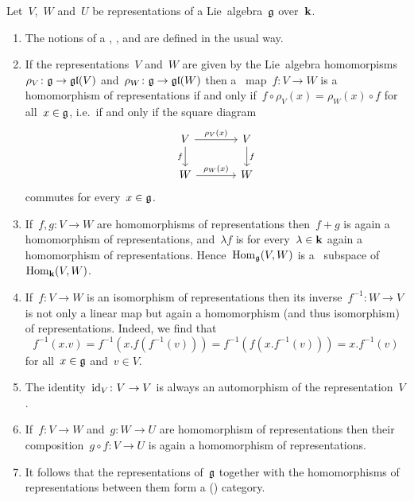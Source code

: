 \begin{remark}
  Let~$V$,~$W$ and~$U$ be representations of a Lie~algebra~$\mathfrak{g}$ over~$\kf$.
  \begin{enumerate}
    \item
      The notions of a , ,  and  are defined in the usual way.
    \item
      If the representations~$V$ and~$W$ are given by the Lie~algebra homomorpisms~$\rho_V \colon \mathfrak{g} \to \mathfrak{gl}(V)$ and~$\rho_W \colon \mathfrak{g} \to \mathfrak{gl}(W)$ then a~{\linear{$\kf$}} map~$f \colon V \to W$ is a homomorphism of representations if and only if~$f \circ \rho_V(x) = \rho_W(x) \circ f$ for all~$x \in \mathfrak{g}$, i.e.\ if and only if the square diagram
      \[
        \begin{tikzcd}[column sep = large]
          V
          \arrow{r}[above]{\rho_V(x)}
          \arrow{d}[left]{f}
          &
          V
          \arrow{d}[right]{f}
          \\
          W
          \arrow{r}[above]{\rho_W(x)}
          &
          W
        \end{tikzcd}
      \]
      commutes for every~$x \in \mathfrak{g}$.
    \item
      If~$f, g \colon V \to W$ are homomorphisms of representations then~$f + g$ is again a homomorphism of representations, and~$\lambda f$ is for every~$\lambda \in \mathbf{k}$ again a homomorphism of representations.
      Hence~$\operatorname{Hom}_{\mathfrak{g}}(V,W)$ is a~{\linear{$\kf$}} subspace of~$\operatorname{Hom}_{\mathbf{k}}(V,W)$.
    \item
      If~$f \colon V \to W$ is an isomorphism of representations then its inverse~$f^{-1} \colon W \to V$ is not only a linear map but again a homomorphism (and thus isomorphism) of representations.
      Indeed, we find that
      \[
        f^{-1}(x.v)
        =
        f^{-1}(x.f(f^{-1}(v)))
        =
        f^{-1}(f(x.f^{-1}(v)))
        =
        x.f^{-1}(v)
      \]
      for all~$x \in \mathfrak{g}$ and~$v \in V$.
    \item
      The identity~$\operatorname{id}_V \colon V \to V$ is always an automorphism of the representation~$V$.
    \item
      If~$f \colon V \to W$ and~$g \colon W \to U$ are homomorphism of representations then their composition~$g \circ f \colon V \to U$ is again a homomorphism of representations.
    \item
      It follows that the representations of~$\mathfrak{g}$ together with the homomorphisms of representations between them form a (\linear{$\kf$}) category.
  \end{enumerate}
\end{remark}


